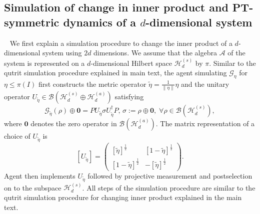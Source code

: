 \documentclass[amsmath,amssymb,aps,pra,superscriptaddress,twocolumn]{revtex4-2}
\begin{document}
\begin{appendix}
\section{Simulation of change in inner product and PT-symmetric dynamics 
of a \texorpdfstring{$d$}{d}-dimensional system}~\label{sec:dsimulation}
We first explain a simulation procedure
to change the inner product of a $d$-dimensional system using $2d$ dimensions.
We assume that the algebra $\mathcal{A}$ of the system is represented on a $d$-dimensional Hilbert space $\mathscr{H}_d^{(s)}$ by $\pi$.
Similar to the qutrit simulation procedure explained in main text,
the agent simulating $\mathcal{G}_\eta$ for $\eta\leq\pi(I)$ first 
constructs the metric operator $\tilde{\eta} =\frac{1}{\|\eta\|}\eta$
and the unitary operator $U_{\tilde{\eta}}\in\mathcal{B}(\mathscr{H}_d^{(s)} \oplus \mathscr{H}_d^{(a)} )$
satisfying 
\begin{equation}\label{eq:Getad}
    \mathcal{G}_{\tilde{\eta}}(\rho)\oplus \bm{0} = PU_{\tilde{\eta}}\sigma U_{\tilde{\eta}}^\dagger P,\, \sigma:=\rho\oplus \bm{0},
    \;\forall \rho\in \mathcal{B}(\mathscr{H}_d^{(s)}),
\end{equation}
where $\bm{0}$ denotes the zero operator in $\mathcal{B}(\mathscr{H}_d^{(a)})$.
The matrix representation of a choice of $U_{\tilde{\eta}}$ is
\begin{equation}
\label{eq:Uetad}
    \left[U_{\tilde{\eta}}\right]
    = \begin{pmatrix}
    \left[\tilde{\eta}\right]^{\frac12} & \left[1-\tilde{\eta}\right]^{\frac12} \\ \left[1-\tilde{\eta}\right]^{\frac12} & - \left[\tilde{\eta}\right]^{\frac12}
    \end{pmatrix}.
\end{equation}
Agent then implements  $U_{\tilde{\eta}}$
followed by projective measurement and postselection on to the subspace $\mathscr{H}_d^{(s)}$.
All steps of the simulation procedure are similar to the qutrit simulation procedure for changing inner product
explained in the main text.


\end{appendix}
\end{document}
